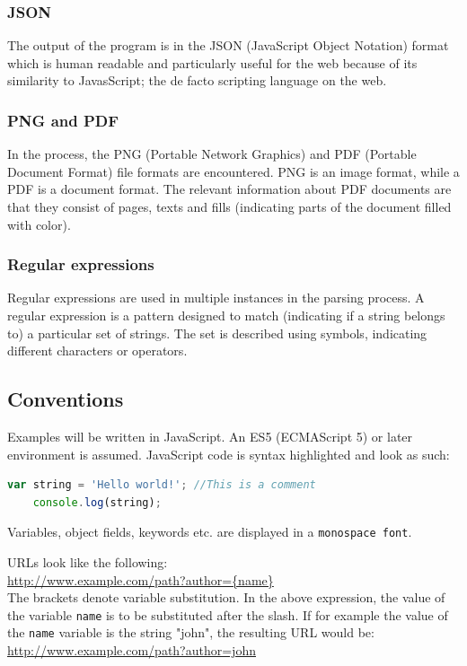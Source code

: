 \documentclass{article}
\begin{document}
	\subsubsection{JSON}
	The output of the program is in the JSON (JavaScript Object Notation) format which is human readable and particularly useful for the web because of its similarity to JavasScript; the de facto scripting language on the web.\cite{wikipedia json}
	
	\subsubsection{PNG and PDF}
	In the process, the PNG (Portable Network Graphics) and PDF (Portable Document Format) file formats are encountered. PNG is an image format, while a PDF is a document format. The relevant information about PDF documents are that they consist of pages, texts and fills (indicating parts of the document filled with color).\cite{wikipedia png}\cite{wikipedia pdf}
	
	\subsubsection{Regular expressions}
	Regular expressions are used in multiple instances in the parsing process. A regular expression is a pattern designed to match (indicating if a string belongs to) a particular set of strings. The set is described using symbols, indicating different characters or operators.\cite{wikipedia regex}
	
	\subsection{Conventions}
	Examples will be written in JavaScript. An ES5 (ECMAScript 5) or later environment is assumed. JavaScript code is syntax highlighted and look as such:
	\begin{lstlisting}[language=JavaScript]
	var string = 'Hello world!'; //This is a comment
	console.log(string);
	\end{lstlisting}
	
	Variables, object fields, keywords etc. are displayed in a \texttt{monospace font}.
	
	URLs look like the following:\\
	\url{http://www.example.com/path?author={name}}\\
	The brackets denote variable substitution. In the above expression, the value of the variable \texttt{name} is to be substituted after the slash. If for example the value of the \texttt{name} variable is the string "john", the resulting URL would be:\\
	\url{http://www.example.com/path?author=john}
	
\end{document}
